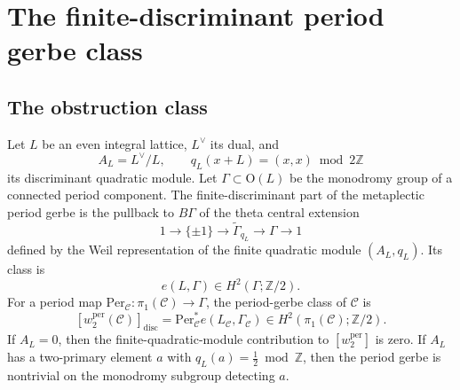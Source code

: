 %

\providecommand{\Sp}{\mathrm{Sp}}
\providecommand{\Mp}{\mathrm{Mp}}
\providecommand{\Orth}{\mathrm{O}}
\providecommand{\SO}{\mathrm{SO}}
\providecommand{\Spin}{\mathrm{Spin}}
\providecommand{\Z}{\mathbb{Z}}
\providecommand{\Q}{\mathbb{Q}}
\providecommand{\R}{\mathbb{R}}
\providecommand{\C}{\mathbb{C}}
\providecommand{\A}{\mathbb{A}}
\providecommand{\CY}{\mathrm{CY}}
\providecommand{\NS}{\mathrm{NS}}
\providecommand{\Muk}{\widetilde{H}}
\providecommand{\disc}{\mathrm{disc}}
\providecommand{\Per}{\mathrm{Per}}
\providecommand{\Hilb}{\mathrm{Hilb}}
\providecommand{\Enr}{\mathrm{Enr}}
\providecommand{\Brau}{\mathrm{Br}}
\providecommand{\Num}{\mathrm{Num}}
\providecommand{\cA}{\mathcal{A}}
\providecommand{\cC}{\mathcal{C}}
\providecommand{\cL}{\mathcal{L}}
\providecommand{\cO}{\mathcal{O}}
\providecommand{\wper}{w_2^{\mathrm{per}}}
\providecommand{\kch}{\kappa_{\mathrm{ch}}}
\providecommand{\kcat}{\kappa_{\mathrm{cat}}}
\providecommand{\kBKM}{\kappa_{\mathrm{BKM}}}
\providecommand{\kfib}{\kappa_{\mathrm{fiber}}}

\section{The finite-discriminant period gerbe class}
\label{sec:wper-mukai-discriminant}

\subsection*{The obstruction class}

Let $L$ be an even integral lattice, $L^\vee$ its dual, and
\[
  A_L=L^\vee/L,\qquad q_L(x+L)=(x,x)\bmod 2\Z
\]
its discriminant quadratic module.  Let $\Gamma\subset\Orth(L)$ be
the monodromy group of a connected period component.  The
finite-discriminant part of the metaplectic period gerbe is the
pullback to $B\Gamma$ of the theta central extension
\[
  1\longrightarrow \{\pm1\}
  \longrightarrow \widetilde{\Gamma}_{q_L}
  \longrightarrow \Gamma
  \longrightarrow 1
\]
defined by the Weil representation of the finite quadratic module
$(A_L,q_L)$.  Its class is
\[
  e(L,\Gamma)\in H^2(\Gamma;\Z/2).
\]
For a period map $\Per_{\cC}:\pi_1(\cC)\to\Gamma$, the period-gerbe
class of $\cC$ is
\[
  [\wper(\cC)]_{\mathrm{disc}} =
  \Per_{\cC}^{*}e(L_\cC,\Gamma_\cC)
  \in H^2(\pi_1(\cC);\Z/2).
\]
If $A_L=0$, then the finite-quadratic-module contribution to
$[\wper]$ is zero.  If $A_L$ has a two-primary element $a$ with
$q_L(a)=\frac12\bmod\Z$, then the period gerbe is nontrivial on the
monodromy subgroup detecting $a$.

